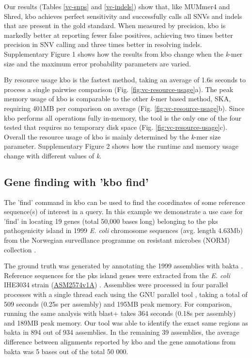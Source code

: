 \documentclass[unnumsec,webpdf,contemporary,large]{oup-authoring-template}%
\theoremstyle{thmstyleone}%
\theoremstyle{thmstyletwo}%
\theoremstyle{thmstylethree}%
\begin{document}
Our results (Tables \ref{vc-snps} and \ref{vc-indels}) show that, like MUMmer4 and Shred, {\sf kbo} achieves perfect sensitivity and successfully calls all SNVs and indels that are present in the gold standard. When measured by precision, {\sf kbo} is markedly better at reporting fewer false positives, achieving two times better precision in SNV calling and three times better in resolving indels. Supplementary Figure 1 shows how the results from {\sf kbo} change when the \emph{k}-mer size and the maximum error probability parameters are varied.

By resource usage {\sf kbo} is the fastest method, taking an average of 1.6s seconds to process a single pairwise comparison (Fig. \ref{fig:vc-resource-usage}a). The peak memory usage of {\sf kbo} is comparable to the other \emph{k}-mer based method, SKA, requiring 401MB per comparison on average (Fig. \ref{fig:vc-resource-usage}b). Since {\sf kbo} performs all operations fully in-memory, the tool is the only one of the four tested that requires no temporary disk space (Fig. \ref{fig:vc-resource-usage}c). Overall the resource usage of {\sf kbo} is mainly determined by the \emph{k}-mer size parameter. Supplementary Figure 2 shows how the runtime and memory usage change with different values of \emph{k}.

\subsection{Gene finding with 'kbo find'}
The 'find' command in {\sf kbo} can be used to find the coordinates of some reference sequence(s) of interest in a query. In this example we demonstrate a use case for 'find' in locating 19 genes (total 50,000 bases long) belonging to the pks pathogenicity island in 1999 \textit{E. coli} chromosome sequences (avg. length 4.63Mb) from the Norwegian surveillance programme on resistant microbes (NORM) collection \cite{gladstone2021emergence, arredondo2023escherichia}.

The ground truth was generated by annotating the 1999 assemblies with bakta \cite{schwengers2021bakta}. Reference sequences for the pks island genes were extracted from the \textit{E. coli} IHE3034 strain (\href{https://www.ebi.ac.uk/ena/browser/view/GCA_000025745.1}{ASM2574v1A}) \cite{moriel2010identification}. Assemblies were processed in four parallel processes with a single thread each using the GNU parallel tool \cite{tange_2024_13826092}, taking a total of 509 seconds (0.25s per assembly) and 195MB peak memory. For comparison, running the same analysis with blast+ \cite{camacho2009blast+} takes 364 seconds (0.18s per assembly) and 189MB peak memory. Our tool was able to identify the exact same regions as bakta in 894 out of 934 assemblies. In the remaining 39 assemblies, the average difference between alignments reported by {\sf kbo} and the gene annotations from bakta was 5 bases out of the total 50 000.
\end{document}
